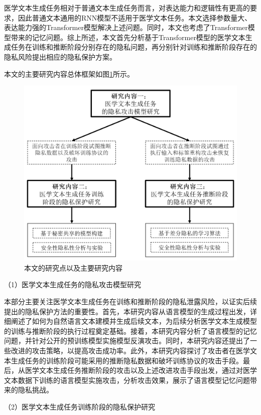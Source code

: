 医学文本生成任务相对于普通文本生成任务而言，对表达能力和逻辑性有更高的要求，因此普通文本通用的RNN模型不适用于医学文本任务。本文选择参数量大、表达能力强的Transformer模型解决上述问题。同时，本文也考虑了Transformer模型带来的记忆问题。综上所述，本文首先分析基于Transformer模型的医学文本生成任务在训练和推断阶段分别存在的隐私问题，再分别针对训练和推断阶段存在的隐私风险提出相应的隐私保护方案。

本文的主要研究内容总体框架如图\ref{Three_Chap_Structure}所示。

\begin{figure}[h]
	\centering
	\includegraphics[width=0.85\linewidth]{figures/Three_Chap_Structure.png}
	\caption{本文的研究点以及主要研究内容}
	\label{Three_Chap_Structure}
\end{figure}

（1）医学文本生成任务的隐私攻击模型研究

本部分主要关注医学文本生成任务在训练和推断阶段的隐私泄露风险，以证实后续提出的隐私保护方法的重要性。首先，本研究内容从语言模型的生成过程出发，详细阐述了如何为自然语言文本建模并生成后续文本，为后续分析医学文本生成模型的训练与推断阶段的执行过程奠定基础。接着，本研究内容分析了语言模型的记忆问题，并针对公开的预训练模型实施模型反演攻击。同时，本研究内容还提出了一些改进的攻击策略，以提高攻击成功率。此外，本研究内容探讨了攻击者在医学文本生成任务的训练阶段可能采用的推断隐私数据和破坏训练协议的攻击手段。最后，从医学文本生成任务推断阶段的攻击以及上述改进攻击手段出发，通过对医学文本数据下训练的语言模型实施攻击，分析攻击效果，展示了语言模型记忆问题带来的隐私挑战。


（2）医学文本生成任务训练阶段的隐私保护研究


